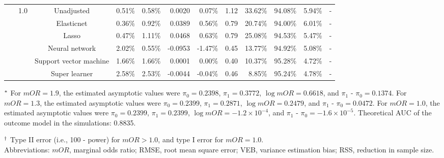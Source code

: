 \documentclass{article}
\begin{document}
\begin{center}
\begin{table}[!ht]
\begin{tabular*}{\textwidth}{@{\extracolsep\fill}c|c|c|rrrr|rrrrr}
        ~ & \multirow{6}{*}{1.0} & Unadjusted & 0.51\% & 0.58\% & 0.0020 & 0.07\% & 1.12 & 33.62\% & 94.08\% & 5.94\% & \multicolumn{1}{c}{-} \\ 
        ~ & ~ & Elasticnet & 0.36\% & 0.92\% & 0.0389 & 0.56\% & 0.79 & 20.74\% & 94.00\% & 6.01\% & \multicolumn{1}{c}{-} \\ 
        ~ & ~ & Lasso & 0.47\% & 1.11\% & 0.0468 & 0.63\% & 0.79 & 25.08\% & 94.53\% & 5.47\% & \multicolumn{1}{c}{-} \\ 
        ~ & ~ & Neural network & 2.02\% & 0.55\% & -0.0953 & -1.47\% & 0.45 & 13.77\% & 94.92\% & 5.08\% & \multicolumn{1}{c}{-} \\ 
        ~ & ~ & Support vector machine & 1.66\% & 1.66\% & 0.0001 & 0.00\% & 0.40 & 10.37\% & 95.28\% & 4.72\% & \multicolumn{1}{c}{-} \\ 
        ~ & ~ & Super learner & 2.58\% & 2.53\% & -0.0044 & -0.04\% & 0.46 & 8.85\% & 95.24\% & 4.78\% & \multicolumn{1}{c}{-} \\  
\bottomrule
\end{tabular*}
\begin{tablenotes}
\item[$^{\rm *}$] For $mOR=1.9$, the estimated asymptotic values were $\pi_0 = 0.2398$,  $\pi_1 = 0.3772$,  $\log mOR = 0.6618$,  and $\pi_1$ - $\pi_0 = 0.1374$.  For $mOR=1.3$,  the estimated asymptotic values were $\pi_0 = 0.2399$,  $\pi_1 = 0.2871$,  $\log mOR = 0.2479$,  and $\pi_1$ - $\pi_0 = 0.0472$. For $mOR=1.0$, the estimated asymptotic values were $\pi_0 = 0.2399$,  $\pi_1 = 0.2399$,  $\log mOR = -1.2\times 10^{-4}$,  and  $\pi_1$ - $\pi_0 = -1.6\times 10^{-5}$. Theoretical AUC of the outcome model in the simulations: 0.8835.
\item[$^{\rm \dagger}$]Type II error (i.e., 100 - power) for $mOR>1.0$, and type I error for $mOR=1.0$.\\
Abbreviations:  $mOR$, marginal odds ratio; RMSE, root mean square error; VEB, variance estimation bias; RSS,  reduction in sample size.
\end{tablenotes}
\end{table}
\end{center}
\end{document}
